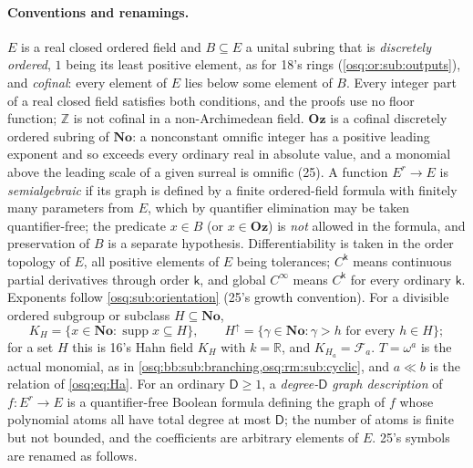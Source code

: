 \documentclass[11pt,letterpaper]{article}
\numberwithin{equation}{section}
\theoremstyle{definition}
\theoremstyle{remark}
\theoremstyle{plain}
\newcommand{\No}{\mathbf{No}}
\newcommand{\Oz}{\mathbf{Oz}}
\newcommand{\Z}{\mathbb Z}
\newcommand{\R}{\mathbb R}
\newcommand{\FF}{\mathscr F}         %
\newcommand{\supp}{\operatorname{supp}}
\begin{document}
\paragraph{Conventions and renamings.} $E$ is a real closed ordered field and $B\subseteq E$ a unital subring that is \emph{discretely ordered}, $1$
being its least positive element, as for 18's rings (\cref{osq:or:sub:outputs}), and \emph{cofinal}: every element of $E$ lies below some element of $B$.
Every integer part of a real closed field satisfies both conditions, and the proofs use no floor function; $\Z$ is not cofinal in a
non-Archimedean field. $\Oz$ is a cofinal discretely ordered subring of $\No$: a nonconstant omnific integer has a positive leading exponent and so
exceeds every ordinary real in absolute value, and a monomial above the leading scale of a given surreal is omnific (25). A function $E^r\to E$ is
\emph{semialgebraic} if its graph is defined by a finite ordered-field formula with finitely many parameters from $E$, which by quantifier elimination may
be taken quantifier-free; the predicate $x\in B$ (or $x\in\Oz$) is \emph{not} allowed in the formula, and preservation of $B$ is a separate hypothesis.
Differentiability is taken in the order topology of $E$, all positive elements of $E$ being tolerances; $C^{\mathsf k}$ means continuous partial
derivatives through order $\mathsf k$, and global $C^\infty$ means $C^{\mathsf k}$ for every ordinary $\mathsf k$. Exponents follow
\cref{osq:sub:orientation} (25's growth convention). For a divisible ordered subgroup or subclass $H\subseteq\No$,
\begin{equation}\label{osq:sa:eq:KH}
 K_H=\{x\in\No:\supp x\subseteq H\},\qquad H^{\uparrow}=\{\gamma\in\No:\gamma>h\text{ for every }h\in H\};
\end{equation}
for a set $H$ this is 16's Hahn field $K_H$ with $k=\R$, and $K_{H_a}=\FF_a$. $T=\omega^a$ is the actual monomial, as in
\cref{osq:bb:sub:branching,osq:rm:sub:cyclic}, and $a\ll b$ is the relation of \eqref{osq:eq:Ha}. For an ordinary $\mathsf D\ge1$, a \emph{degree-$\mathsf
D$ graph description} of $f:E^r\to E$ is a quantifier-free Boolean formula defining the graph of $f$ whose polynomial atoms all have total degree at most
$\mathsf D$; the number of atoms is finite but not bounded, and the coefficients are arbitrary elements of $E$. 25's symbols are renamed as follows.
\end{document}
